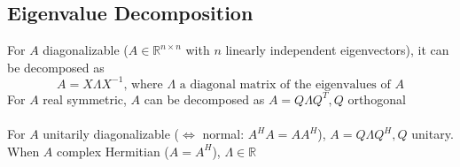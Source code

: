 \documentclass{article}
\begin{document}
\subsection{Eigenvalue Decomposition}
For $A$ diagonalizable ($A\in \mathbb{R}^{n\times n}$ with $n$ linearly independent eigenvectors), it can be decomposed as
\begin{equation*}
    A = X \Lambda X^{-1} \textrm{, where $\Lambda$ a diagonal matrix of the eigenvalues of $A$}
\end{equation*}
For $A$ real symmetric, $A$ can be decomposed as $A = Q\Lambda Q^T, Q$ orthogonal\\ \\
For $A$ unitarily diagonalizable ($\Leftrightarrow$ normal: $A^HA = AA^H$), $A= Q\Lambda Q^H, Q$ unitary. When $A$ complex Hermitian ($A = A^H$), $\Lambda \in \mathbb{R}$


\end{document}
